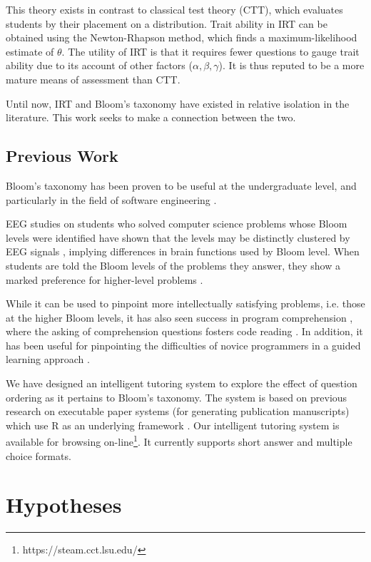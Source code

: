 \documentclass[a4paper,twocolumn]{article}
\begin{document}
This theory exists in contrast to classical test theory (CTT), which evaluates
students by their placement on a distribution.  Trait ability in IRT can be
obtained using the Newton-Rhapson method, which finds a maximum-likelihood
estimate of $\theta$.  The utility of IRT is that it requires fewer questions
to gauge trait ability due to its account of other factors ($\alpha, \beta,
\gamma$). It is thus reputed to be a more mature means of assessment than CTT.

Until now, IRT and Bloom's taxonomy have existed in relative isolation in the
literature.  This work seeks to make a connection between the two.


\subsection{Previous Work}

Bloom's taxonomy has been proven to be useful at the undergraduate level, and
particularly in the field of software engineering \cite{britto2015}
\cite{mahmood2014}.

EEG studies on students who solved computer science problems whose Bloom levels
were identified have shown that the levels may be distinctly clustered by EEG
signals \cite{chatterjee2015}, implying differences in brain functions used by
Bloom level.  When students are told the Bloom levels of the problems they
answer, they show a marked preference for higher-level problems
\cite{bruyn2011} \cite{goel2004}.

While it can be used to pinpoint more intellectually satisfying problems, i.e.
those at the higher Bloom levels, it has also seen success in program
comprehension \cite{buckley2003}, where the asking of comprehension questions
fosters code reading \cite{losada2008}. In addition, it has been useful for
pinpointing the difficulties of novice programmers in a guided learning
approach \cite{shuhidan2011}.

We have designed an intelligent tutoring system to explore the effect of
question ordering as it pertains to Bloom's taxonomy.  The system is based on
previous research on executable paper systems (for generating publication
manuscripts) which use R as an underlying framework \cite{castleberry2011}.
Our intelligent tutoring system is available for browsing
on-line\footnote{https://steam.cct.lsu.edu/}. It currently supports short
answer and multiple choice formats.

\section{Hypotheses}
\end{document}
